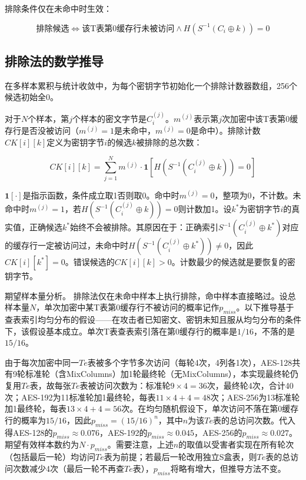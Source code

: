 排除条件仅在未命中时生效：

\begin{equation}
\text{排除候选} \Leftrightarrow \text{该T表第0缓存行未被访问} \land H(S^{-1}(C_i \oplus k)) = 0
\end{equation}

\subsection{排除法的数学推导}

在多样本累积与统计收敛中，为每个密钥字节初始化一个排除计数器数组，256个候选初始全0。

对于$N$个样本，第$j$个样本的密文字节是$C_i^{(j)}$。$m^{(j)}$表示第$j$次加密中该T表第0缓存行是否没被访问（$m^{(j)} = 1$是未命中，$m^{(j)} = 0$是命中）。排除计数$CK[i][k]$定义为密钥字节$i$的候选$k$被排除的总次数：

\begin{equation}
CK[i][k] = \sum_{j=1}^{N} m^{(j)} \cdot \mathbf{1}[H(S^{-1}(C_i^{(j)} \oplus k)) = 0]
\end{equation}

$\mathbf{1}[\cdot]$是指示函数，条件成立取1否则取0。命中时$m^{(j)} = 0$，整项为0，不计数。未命中时$m^{(j)} = 1$，若$H(S^{-1}(C_i^{(j)} \oplus k)) = 0$则计数加1。设$k^*$为密钥字节$i$的真实值，正确候选$k^*$始终不会被排除。其原因在于：正确索引$S^{-1}(C_i^{(j)} \oplus k^*)$对应的缓存行一定被访问过，未命中时$H(S^{-1}(C_i^{(j)} \oplus k^*)) \neq 0$，因此$CK[i][k^*] = 0$。错误候选的$CK[i][k] > 0$。计数最少的候选就是要恢复的密钥字节。

期望样本量分析。
排除法仅在未命中样本上执行排除，命中样本直接略过。设总样本量$N$，单次加密中某T表第0缓存行不被访问的概率记作$p_{miss}$。以下推导基于查表索引均匀分布的假设——在攻击者已知密文、密钥未知且服从均匀分布的条件下，该假设基本成立。单次T表查表索引落在第0缓存行的概率是$1/16$，不落的是$15/16$。

由于每次加密中同一$Te$表被多个字节多次访问（每轮4次，4列各1次），AES-128共有9轮标准轮（含MixColumns）加1轮最终轮（无MixColumns），本实现最终轮仍复用$Te$表，故每张$Te$表被访问次数为：标准轮$9 \times 4 = 36$次，最终轮4次，合计40次；AES-192为11标准轮加1最终轮，每表$11 \times 4 + 4 = 48$次；AES-256为13标准轮加1最终轮，每表$13 \times 4 + 4 = 56$次。在均匀随机假设下，单次访问不落在第0缓存行的概率为$15/16$，因此$p_{miss} = (15/16)^n$，其中$n$为该$Te$表的总访问次数。代入得AES-128的$p_{miss} \approx 0.076$，AES-192的$p_{miss} \approx 0.045$，AES-256的$p_{miss} \approx 0.027$。期望有效样本数约为$N \cdot p_{miss}$。需要注意，上述$n$的取值以受害者实现在所有轮次（包括最后一轮）均访问$Te$表为前提；若最后一轮改用独立S盒表，则$Te$表的总访问次数减少4次（最后一轮不再查$Te$表），$p_{miss}$将略有增大，但推导方法不变。

